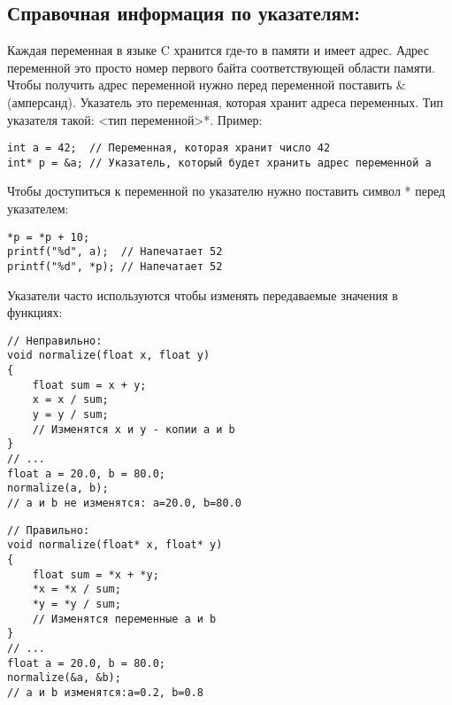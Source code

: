\documentclass{article}
\begin{document}

\newpage
\subsection*{Справочная информация по указателям:}
Каждая переменная в языке C хранится где-то в памяти и имеет адрес. Адрес переменной это просто номер первого байта соответствующей области памяти. Чтобы получить адрес переменной нужно перед переменной поставить \&(амперсанд).
Указатель это переменная, которая хранит адреса переменных. Тип указателя такой: <тип переменной>*. Пример:
\begin{verbatim}
int a = 42;  // Переменная, которая хранит число 42
int* p = &a; // Указатель, который будет хранить адрес переменной a
\end{verbatim}
Чтобы доступиться к переменной по указателю нужно поставить символ * перед указателем:
\begin{verbatim}
*p = *p + 10;
printf("%d", a);  // Напечатает 52
printf("%d", *p); // Напечатает 52
\end{verbatim}
Указатели часто используются чтобы изменять передаваемые значения в функциях:
\begin{multicols}{2}
\begin{verbatim}
// Неправильно:
void normalize(float x, float y)
{
    float sum = x + y;
    x = x / sum;
    y = y / sum; 
    // Изменятся x и y - копии a и b
}
// ...
float a = 20.0, b = 80.0;
normalize(a, b);
// a и b не изменятся: a=20.0, b=80.0
\end{verbatim}
\begin{verbatim}
// Правильно:
void normalize(float* x, float* y)
{
    float sum = *x + *y;
    *x = *x / sum;
    *y = *y / sum; 
    // Изменятся переменные a и b
}
// ...
float a = 20.0, b = 80.0;
normalize(&a, &b);
// a и b изменятся:a=0.2, b=0.8
\end{verbatim}
\end{multicols}
\end{document}
